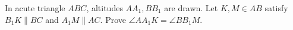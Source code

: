 In acute triangle $ABC$, altitudes $AA_1,BB_1$ are drawn. Let $K,M\in AB$ satisfy $B_1K\parallel BC$ and $A_1M\parallel AC$. Prove $\angle AA_1K=\angle BB_1M$.
